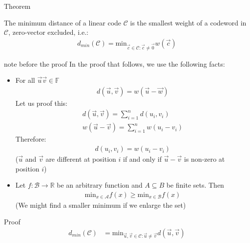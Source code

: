 \begin{parag}{Theorem}
    \begin{theoreme}
    The minimum distance of a linear code $\mathcal{C}$ is the smallest weight of a codeword in $\mathcal{C}$, zero-vector excluded, i.e.:
    \begin{align*} d_{min}\left(\mathcal{C}\right) =  \text{min}_{\vec{c}\in \mathcal{C}: \vec{c}\neq \vec{0}} w\left(\vec{c}\right)\end{align*}
    \end{theoreme}
    \begin{subparag}{note before the proof}
        In the proof that follows, we use the following facts:
        \begin{itemize}
            \item For all $\vec{u} \vec{v} \in \mathbb{F}$ 
                \begin{align*} d\left(\vec{u}, \vec{v}\right) = w\left(\vec{u} - \vec{w}\right) \end{align*}
                Let us proof this:
                \begin{align*}  
                    d\left(\vec{u}, \vec{v}\right) = \sum_{i =  1}^{n} d\left(u_i, v_i\right)\\
                    w\left(\vec{u} - \vec{v}\right) =  \sum_{i =  1}^{n} w\left(u_i - v_i\right)
                \end{align*}
                Therefore:
                \begin{align*} 
                    d\left(u_i, v_i\right) =  w\left(u_i - v_i\right)
                \end{align*}
                ($\vec{u}$ and $\vec{v}$ are different at position $i$ if and only if $\vec{u}-\vec{v}$  is non-zero at position $i$)
            \item Let $f: \mathcal{B} \to \mathbb{R}$ be an arbitrary function and $A \subseteq B$ be finite sets. Then
                \begin{align*} \text{min}_{x \in \mathcal{A}}f\left(x\right) \geq \text{min}_{x \in \mathcal{B}}f\left(x\right) \end{align*}
                (We might find a smaller minimum if we enlarge the set)
        \end{itemize}
    \end{subparag}
    \begin{subparag}{Proof}
        \begin{align*} d_{min}\left(\mathcal{C}\right) &=  \text{min}_{\vec{u}, \vec{v} \in \mathcal{C}: \vec{u}\neq \vec{v}}d\left(\vec{u}, \vec{v}\right) \\

\end{align*}
\end{subparag}
\end{parag}
